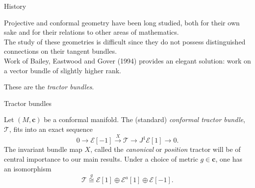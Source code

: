 \documentclass[handout]{beamer}
\begin{document}
\begin{frame}{History}

Projective and conformal geometry have been long studied, both for their own sake and for their relations to other areas of mathematics.
\vspace{1em}\\
\pause
The study of these geometries is difficult since they do not possess distinguished connections on their tangent bundles.
\vspace{1em}\\
\pause
Work of Bailey, Eastwood and Gover (1994) provides an elegant solution: work on a vector bundle of slightly higher rank. 

These are the \emph{tractor bundles}.

\end{frame}

\begin{frame}{Tractor bundles}
  \begin{definition}
    Let \( (M, \bm{c}) \) be a conformal manifold.
    The (standard) \emph{conformal tractor bundle}, \( \mathcal{T} \), fits into an exact sequence
    \pause
    \[
      0 \to \mathcal{E}[-1] \overset{X}{\to} \mathcal{T} \to J^1 \mathcal{E}[1] \to 0.
    \]
    \pause
    The invariant bundle map \( X \), called the \emph{canonical} or \emph{position} tractor will be of central importance to our main results.
    Under a choice of metric \( g \in \bm{c} \), one has an isomorphism 
    \[
      \mathcal{T} \overset{g}{\cong} \mathcal{E}[1] \oplus \mathcal{E}^a [1] \oplus \mathcal{E}[-1].
    \]
  \end{definition}

\end{frame}
\end{document}
